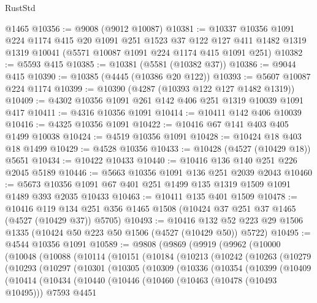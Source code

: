 \begin{lexlean}{RustStd}
\begin{coremodule}
    @1465
@10356 := @9008 (@9012 @10087)
@10381 := @10337
    @10356
    @1091
    @224
    @1174
    @415
    @20
    @1091
    @251
    @1523
    @37
    @122
    @127
    @411
    @1482
    @1319
    @1319
    @10041
    (@5571 @10087 @1091 @224 @1174 @415 @1091 @251)
@10382 := @5593 @415
@10385 := @10381 (@5581 (@10382 @37))
@10386 := @9044 @415
@10390 := @10385 (@4445 (@10386 @20 @122))
@10393 := @5607 @10087 @224 @1174
@10399 := @10390 (@4287 (@10393 @122 @127 @1482 @1319))
@10409 := @4302 @10356 @1091 @261 @142 @406 @251 @1319 @10039 @1091 @417
@10411 := @4316 @10356 @1091
@10414 := @10411 @142 @406 @10039
@10416 := @4325 @10356 @1091
@10422 := @10416 @67 @141 @403 @405 @1499 @10038
@10424 := @4519 @10356 @1091
@10428 := @10424 @18 @403 @18 @1499
@10429 := @4528 @10356
@10433 := @10428 (@4527 (@10429 @18)) @5651
@10434 := @10422 @10433
@10440 := @10416 @136 @140 @251 @226 @2045 @5189
@10446 := @5663 @10356 @1091 @136 @251 @2039 @2043
@10460 := @5673 @10356 @1091 @67 @401 @251 @1499 @135 @1319 @1509 @1091 @1489 @393 @2035 @10433
@10463 := @10411 @135 @401 @1509
@10478 := @10416
    @119
    @134
    @251
    @356
    @1465
    @1508
    (@10424 @37 @251 @37 @1465 (@4527 (@10429 @37)) @5705)
@10493 := @10416
    @132
    @52
    @223
    @29
    @1506
    @1335
    (@10424 @50 @223 @50 @1506 (@4527 (@10429 @50)) @5722)
@10495 := @4544 @10356 @1091
@10589 := @9808
    (@9869
      (@9919
        (@9962
          (@10000
            (@10048
              (@10088
                (@10114
                  (@10151
                    (@10184
                      (@10213
                        (@10242
                          (@10263
                            (@10279
                              (@10293
                                (@10297
                                  (@10301
                                    (@10305
                                      (@10309
                                        (@10336
                                          (@10354
                                            (@10399
                                              (@10409
                                                (@10414
                                                  (@10434
                                                    (@10440
                                                      (@10446
                                                        (@10460
                                                          (@10463 (@10478 (@10493 @10495)))
                                                          @7593
                                                          @4451

\end{coremodule}
\end{lexlean}

